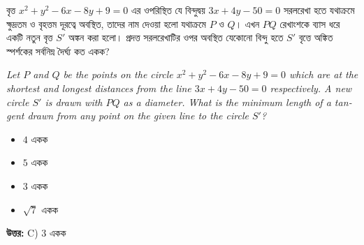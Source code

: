 \documentclass[12pt, a4paper]{article}
\begin{document}
\begin{tcolorbox}[questionbox={প্রশ্ন (Question) 41}]
    \noindent
    বৃত্ত $x^2 + y^2 - 6x - 8y + 9 = 0$ এর ওপরিস্থিত যে বিন্দুদ্বয় $3x + 4y - 50 = 0$ সরলরেখা হতে যথাক্রমে ক্ষুদ্রতম ও বৃহত্তম দূরত্বে অবস্থিত, তাদের নাম দেওয়া হলো যথাক্রমে $P$ ও $Q$। এখন $PQ$ রেখাংশকে ব্যাস ধরে একটি নতুন বৃত্ত $S'$ অঙ্কন করা হলো। প্রদত্ত সরলরেখাটির ওপর অবস্থিত যেকোনো বিন্দু হতে $S'$ বৃত্তে অঙ্কিত স্পর্শকের সর্বনিম্ন দৈর্ঘ্য কত একক?
    
    \vspace{0.8em}
    \begin{english}
    \noindent\textit{\color{darkgray}
    Let $P$ and $Q$ be the points on the circle $x^2 + y^2 - 6x - 8y + 9 = 0$ which are at the shortest and longest distances from the line $3x + 4y - 50 = 0$ respectively. A new circle $S'$ is drawn with $PQ$ as a diameter. What is the minimum length of a tangent drawn from any point on the given line to the circle $S'$?
    }
    \end{english}
\end{tcolorbox}

\vspace{1em}
\begin{itemize}[label={}, leftmargin=1cm, itemsep=0.5em]
    \item[\textbf{A)}] $4$ একক
    \item[\textbf{B)}] $5$ একক
    \item[\textbf{C)}] $3$ একক
    \item[\textbf{D)}] $\sqrt{7}$ একক
\end{itemize}

\vspace{0.5em}
\begin{tcolorbox}[answerbox]
    \textbf{\color{success} উত্তর:} C) $3$ একক
\end{tcolorbox}
\vspace{1em}
\end{document}
